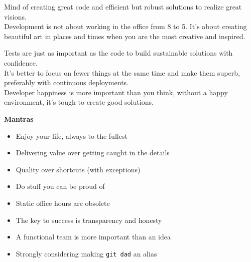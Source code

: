 \documentclass[9pt]{template} %
\begin{document}
\begin{minipage}[t]{0.4\textwidth} %
  \vspace{-\baselineskip}

  Mind of creating great code and efficient but robust solutions to realize great visions.\\

  Development is not about working in the office from 8 to 5. It's about creating beautiful art in places and times when you are the most creative and inspired.

  Tests are just as important as the code to build sustainable solutions with confidence.\\

  It's better to focus on fewer things at the same time and make them superb, preferably with continuous deployments.\\

  Developer happiness is more important than you think, without a happy environment, it's tough to create good solutions.
\end{minipage}
\hfill
\begin{minipage}[t]{0.5\textwidth}
  \vspace{-\baselineskip}
  \textbf{Mantras}
  \begin{itemize}
      \item Enjoy your life, always to the fullest
      \item Delivering value over getting caught in the details
      \item Quality over shortcuts (with exceptions)
      \item Do stuff you can be proud of
      \item Static office hours are obsolete
      \item The key to success is transparency and honesty
      \item A functional team is more important than an idea
      \item Strongly considering making \texttt{git dad} an alias
  \end{itemize}
\end{minipage}


\pagebreak
{}
\end{document}
